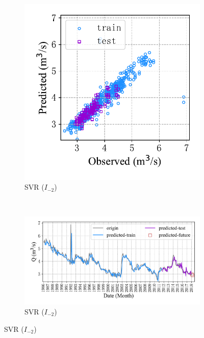 \begin{figure}[!htbp]
\begin{subfigure}[b]{0.615\textwidth}
  \end{subfigure}
  \\
  \begin{subfigure}[b]{0.305\textwidth}
    \includegraphics[width=\textwidth]{Img/chap4_spr/out2/spr_scatter_in_2_out_2_svr.pdf}
    \vspace{-1.2cm}
    \caption{SVR ($I_{-2}$)}
    \label{fig:spr_scatter_in_2_out_2_svr}
  \end{subfigure}
  ~
  \begin{subfigure}[b]{0.615\textwidth}
    \includegraphics[width=\textwidth]{Img/chap4_spr/out2/spr_series_in_2_out_2_svr.pdf}
    \vspace{-1.2cm}
    \caption{SVR ($I_{-2}$)}
    \label{fig:spr_series_in_2_out_2_svr}

\end{subfigure}
\end{figure}
